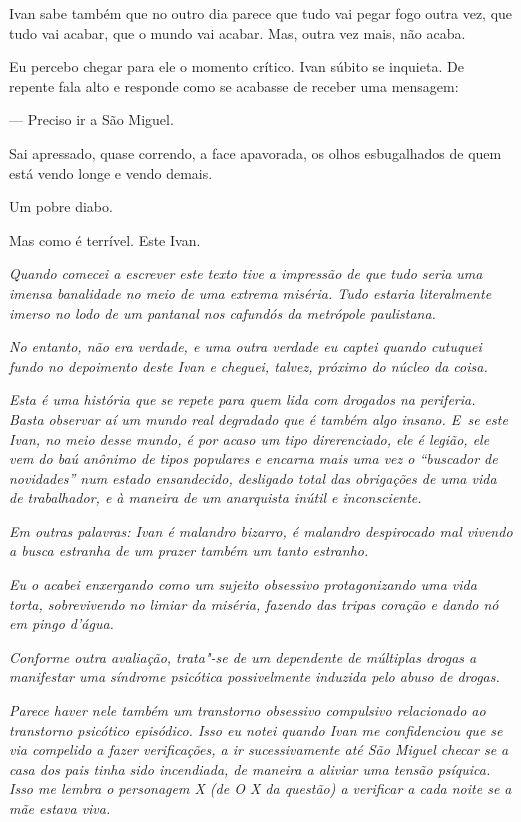 Ivan sabe também que no outro dia parece que tudo vai pegar fogo outra
vez, que tudo vai acabar, que o mundo vai acabar. Mas, outra vez mais,
não acaba.

\asterisc{}

Eu percebo chegar para ele o momento crítico. Ivan súbito se inquieta.
De repente fala alto e responde como se acabasse de receber uma
mensagem:

— Preciso ir a São Miguel.

Sai apressado, quase correndo, a face apavorada, os olhos esbugalhados
de quem está vendo longe e vendo demais.

Um pobre diabo.

Mas como é terrível. Este Ivan.~

\begin{center}\asterisc{}\end{center}
\begingroup\small

\emph{Quando comecei a escrever este texto tive a impressão de que tudo
seria uma imensa banalidade no meio de uma extrema miséria. Tudo estaria
literalmente imerso no lodo de um pantanal nos cafundós da metrópole
paulistana.}~

\emph{No entanto, não era verdade, e uma outra verdade eu captei quando
cutuquei fundo no depoimento deste Ivan e cheguei, talvez, próximo do
núcleo da coisa.}~

\emph{Esta é uma história que se repete para quem lida com drogados na
periferia. Basta observar aí um mundo real degradado que é também algo
insano. E~se este Ivan, no meio desse mundo, é por acaso um tipo
direrenciado, ele é legião, ele vem do baú anônimo de tipos populares e
encarna mais uma vez o ``buscador de novidades'' num estado ensandecido,
desligado total das obrigações de uma vida de trabalhador, e à maneira
de um anarquista inútil e inconsciente.}~

\emph{Em outras palavras: Ivan é malandro bizarro, é malandro
despirocado mal vivendo a busca estranha de um prazer também um tanto
estranho.}~

\emph{Eu o acabei enxergando como um sujeito obsessivo protagonizando
uma vida torta, sobrevivendo no limiar da miséria, fazendo das tripas
coração e dando nó em pingo d'água.}~

\emph{Conforme outra avaliação, trata"-se de um dependente de múltiplas
drogas a manifestar uma síndrome psicótica possivelmente induzida pelo
abuso de drogas.}~

\emph{Parece haver nele também um transtorno obsessivo compulsivo
relacionado ao transtorno psicótico episódico. Isso eu notei quando Ivan
me confidenciou que se via compelido a fazer verificações, a ir
sucessivamente até São Miguel checar se a casa dos pais tinha sido
incendiada, de maneira a aliviar uma tensão psíquica. Isso me lembra o
personagem X (de O X da questão) a verificar a cada noite se a mãe
estava viva.}~

